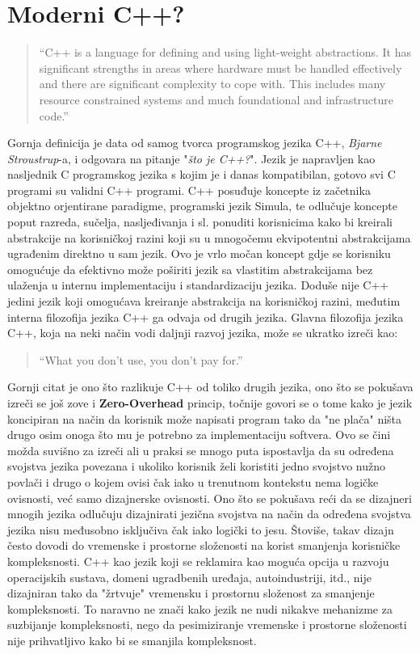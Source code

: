 \section{Moderni C++?}
\begin{quote}
    ``C++ is a language for defining and using light-weight abstractions. It has significant strengths in areas where hardware must be handled effectively and there are significant complexity to cope with. This includes many resource constrained systems and much foundational and infrastructure code.''
\end{quote}
Gornja definicija\cite{bjarneStroustrupC++} je data od samog tvorca programskog jezika C++, \textit{Bjarne Stroustrup}-a, i odgovara na pitanje "\textit{što je C++?}". Jezik je napravljen kao nasljednik C programskog jezika s kojim je i danas kompatibilan, gotovo svi C programi su validni C++ programi. C++ posuđuje koncepte iz začetnika objektno orjentirane paradigme, programski jezik Simula, te odlučuje koncepte poput razreda, sučelja, nasljeđivanja i sl. ponuditi korisnicima kako bi kreirali abstrakcije na korisničkoj razini koji su u mnogočemu ekvipotentni abstrakcijama ugrađenim direktno u sam jezik. Ovo je vrlo močan koncept gdje se korisniku omogućuje da efektivno može poširiti jezik sa vlastitim abstrakcijama bez ulaženja u internu implementaciju i standardizaciju jezika. Doduše nije C++ jedini jezik koji omogućava kreiranje abstrakcija na korisničkoj razini, međutim interna filozofija jezika C++ ga odvaja od drugih jezika. Glavna filozofija jezika C++, koja na neki način vodi daljnji razvoj jezika, može se ukratko izreči kao\cite{theDesignAndEvolutionOfC++}:
\begin{quote}
    ``What you don't use, you don't pay for.''
\end{quote}
Gornji citat je ono što razlikuje C++ od toliko drugih jezika, ono što se pokušava izreči se još zove i \textbf{Zero-Overhead} princip, točnije govori se o tome kako je jezik koncipiran na način da korisnik može napisati program tako da "ne plača" ništa drugo osim onoga što mu je potrebno za implementaciju softvera. Ovo se čini možda suvišno za izreči ali u praksi se mnogo puta ispostavlja da su određena svojstva jezika povezana i ukoliko korisnik želi koristiti jedno svojstvo nužno povlači i drugo o kojem ovisi čak iako u trenutnom kontekstu nema logičke ovisnosti, već samo dizajnerske ovisnosti. Ono što se pokušava reći da se dizajneri mnogih jezika odlučuju dizajnirati jezična svojstva na način da određena svojstva jezika nisu međusobno isključiva čak iako logički to jesu. Štoviše, takav dizajn često dovodi do vremenske i prostorne složenosti na korist smanjenja korisničke kompleksnosti. C++ kao jezik koji se reklamira kao moguća opcija u razvoju operacijskih sustava, domeni ugradbenih uređaja, autoindustriji, itd., nije dizajniran tako da "žrtvuje" vremensku i prostornu složenost za smanjenje kompleksnosti. To naravno ne znači kako jezik ne nudi nikakve mehanizme za suzbijanje kompleksnosti, nego da pesimiziranje vremenske i prostorne složenosti nije prihvatljivo kako bi se smanjila kompleksnost. \\

